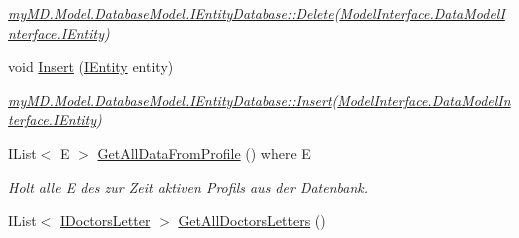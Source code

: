 \begin{CompactItemize}
\begin{CompactList}\small\item\em \hyperlink{interfacemy_m_d_1_1_model_1_1_database_model_1_1_i_entity_database_1ec3022b27f9091440cb495f510d25b0}{my\-MD.Model.Database\-Model.IEntity\-Database::Delete}(\hyperlink{interfacemy_m_d_1_1_model_interface_1_1_data_model_interface_1_1_i_entity}{Model\-Interface.Data\-Model\-Interface.IEntity}) \item\end{CompactList}\item 
\hypertarget{classmy_m_d_1_1_model_1_1_database_model_1_1_entity_database_71b401e7c809fdda0a0b15b6792e69c8}{
void \hyperlink{classmy_m_d_1_1_model_1_1_database_model_1_1_entity_database_71b401e7c809fdda0a0b15b6792e69c8}{Insert} (\hyperlink{interfacemy_m_d_1_1_model_interface_1_1_data_model_interface_1_1_i_entity}{IEntity} entity)}
\label{dd/d77/classmy_m_d_1_1_model_1_1_database_model_1_1_entity_database_71b401e7c809fdda0a0b15b6792e69c8}

\begin{CompactList}\small\item\em \hyperlink{interfacemy_m_d_1_1_model_1_1_database_model_1_1_i_entity_database_71b401e7c809fdda0a0b15b6792e69c8}{my\-MD.Model.Database\-Model.IEntity\-Database::Insert}(\hyperlink{interfacemy_m_d_1_1_model_interface_1_1_data_model_interface_1_1_i_entity}{Model\-Interface.Data\-Model\-Interface.IEntity}) \item\end{CompactList}\item 
IList$<$ E $>$ \hyperlink{classmy_m_d_1_1_model_1_1_database_model_1_1_entity_database_04d844f17f0406ef8ab2156907984b7e}{Get\-All\-Data\-From\-Profile} () where E
\begin{CompactList}\small\item\em Holt alle E des zur Zeit aktiven Profils aus der Datenbank. \item\end{CompactList}\item 
\hypertarget{classmy_m_d_1_1_model_1_1_database_model_1_1_entity_database_d824e78a8274c2fc04719a66a7030fd7}{
IList$<$ \hyperlink{interfacemy_m_d_1_1_model_interface_1_1_data_model_interface_1_1_i_doctors_letter}{IDoctors\-Letter} $>$ \hyperlink{classmy_m_d_1_1_model_1_1_database_model_1_1_entity_database_d824e78a8274c2fc04719a66a7030fd7}{Get\-All\-Doctors\-Letters} ()}
\label{dd/d77/classmy_m_d_1_1_model_1_1_database_model_1_1_entity_database_d824e78a8274c2fc04719a66a7030fd7}


\end{CompactItemize}
